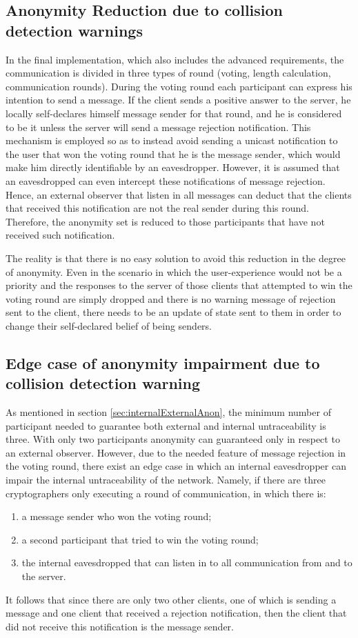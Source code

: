 \subsection{Anonymity Reduction due to collision detection warnings}
In the final implementation, which also includes the advanced requirements, the communication is divided in three types of round (voting, length calculation, communication rounds). During the voting round each participant can express his intention to send a message. If the client sends a positive answer to the server, he locally self-declares himself message sender for that round, and he is considered to be it unless the server will send a message rejection notification. This mechanism is employed so as to instead avoid sending a unicast notification to the user that won the voting round that he is the message sender, which would make him directly identifiable by an eavesdropper. However, it is assumed that an eavesdropped can even intercept these notifications of message rejection. Hence, an external observer that listen in all messages can deduct that the clients that received this notification are not the real sender during this round. Therefore, the anonymity set is reduced to those participants that have not received such notification.

The reality is that there is no easy solution to avoid this reduction in the degree of anonymity. Even in the scenario in which the user-experience would not be a priority and the responses to the server of those clients that attempted to win the voting round are simply dropped and there is no warning message of rejection sent to the client, there needs to be an update of state sent to them in order to change their self-declared belief of being senders.

\subsection{Edge case of anonymity impairment due to collision detection warning}
As mentioned in section \ref{sec:internalExternalAnon}, the minimum number of participant needed to guarantee both external and internal untraceability is three. With only two participants anonymity can guaranteed only in respect to an external observer. However, due to the needed feature of message rejection in the voting round, there exist an edge case in which an internal eavesdropper can impair the internal untraceability of the network. Namely, if there are three cryptographers only executing a round of communication, in which there is:
\begin{enumerate}
    \item a message sender who won the voting round;
    \item a second participant that tried to win the voting round;
    \item the internal eavesdropped that can listen in to all communication from and to the server.
\end{enumerate}
It follows that since there are only two other clients, one of which is sending a message and one client that received a rejection notification, then the client that did not receive this notification is the message sender.

